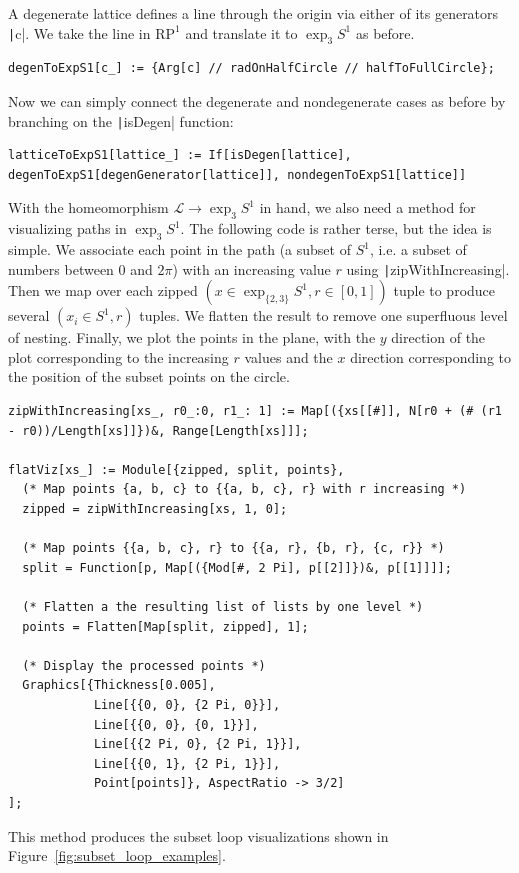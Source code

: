 \documentclass[12pt,twoside]{reedthesis}
\theoremstyle{definition}
\newcommand{\LS}{\mathcal{L}}
\newcommand{\exptwothree}{\exp_{\{2,3\}}}
\newcommand{\mathe}[1]{\texttt|#1|}
\begin{document}
A degenerate lattice defines a line through the origin via either of its generators \texttt|c|.
We take the line in $\mathrm{RP}^1$ and translate it to $\exp_3 S^1$ as before.
\begin{verbatim}
degenToExpS1[c_] := {Arg[c] // radOnHalfCircle // halfToFullCircle};
\end{verbatim}
Now we can simply connect the degenerate and nondegenerate cases as before by branching on the \texttt|isDegen| function:
\begin{verbatim}
latticeToExpS1[lattice_] := If[isDegen[lattice], degenToExpS1[degenGenerator[lattice]], nondegenToExpS1[lattice]]
\end{verbatim}
With the homeomorphism $\LS \to \exp_3 S^1$ in hand, we also need a method for visualizing paths in $\exp_3 S^1$.
The following code is rather terse, but the idea is simple.
We associate each point in the path (a subset of $S^1$, i.e. a subset of numbers between 0 and $2\pi$) with an increasing value $r$ using \mathe{zipWithIncreasing}.
Then we map over each zipped $(x \in \exptwothree S^1, r \in [0,1])$ tuple to produce several $(x_i \in S^1, r)$ tuples.
We flatten the result to remove one superfluous level of nesting.
Finally, we plot the points in the plane, with the $y$ direction of the plot corresponding to the increasing $r$ values and the $x$ direction corresponding to the position of the subset points on the circle.
\begin{verbatim}
zipWithIncreasing[xs_, r0_:0, r1_: 1] := Map[({xs[[#]], N[r0 + (# (r1 - r0))/Length[xs]]})&, Range[Length[xs]]];

flatViz[xs_] := Module[{zipped, split, points},
  (* Map points {a, b, c} to {{a, b, c}, r} with r increasing *)
  zipped = zipWithIncreasing[xs, 1, 0];

  (* Map points {{a, b, c}, r} to {{a, r}, {b, r}, {c, r}} *)
  split = Function[p, Map[({Mod[#, 2 Pi], p[[2]]})&, p[[1]]]];

  (* Flatten a the resulting list of lists by one level *)
  points = Flatten[Map[split, zipped], 1];

  (* Display the processed points *)
  Graphics[{Thickness[0.005],
            Line[{{0, 0}, {2 Pi, 0}}],
            Line[{{0, 0}, {0, 1}}],
            Line[{{2 Pi, 0}, {2 Pi, 1}}],
            Line[{{0, 1}, {2 Pi, 1}}],
            Point[points]}, AspectRatio -> 3/2]
];
\end{verbatim}
This method produces the subset loop visualizations shown in Figure~\ref{fig:subset_loop_examples}.

\printbibliography[heading=bibintoc]
\end{document}

